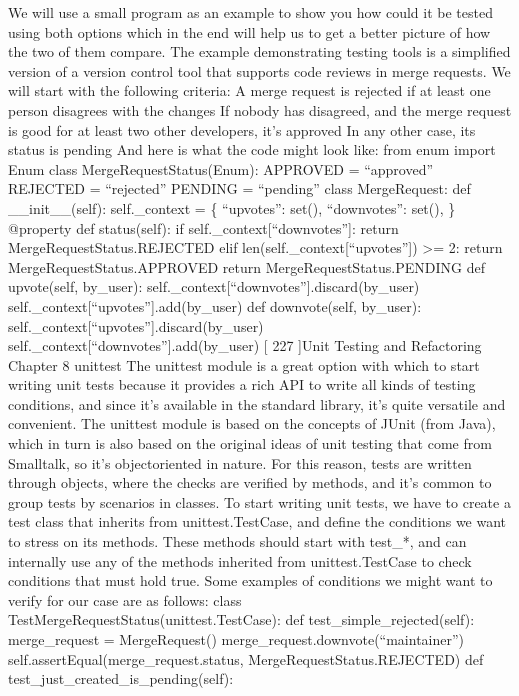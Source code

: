 \documentclass[a4paper,10pt,english]{sphinxmanual}
\begin{document}
We will use a small program as an example to show you how could it be tested using both
options which in the end will help us to get a better picture of how the two of them
compare.
The example demonstrating testing tools is a simplified version of a version control tool
that supports code reviews in merge requests. We will start with the following criteria:
A merge request is rejected if at least one person disagrees with the changes
If nobody has disagreed, and the merge request is good for at least two other
developers, it’s approved
In any other case, its status is pending
And here is what the code might look like:
from enum import Enum
class MergeRequestStatus(Enum):
APPROVED = “approved”
REJECTED = “rejected”
PENDING = “pending”
class MergeRequest:
def \_\_init\_\_(self):
self.\_context = \{
“upvotes”: set(),
“downvotes”: set(),
\}
@property
def status(self):
if self.\_context{[}“downvotes”{]}:
return MergeRequestStatus.REJECTED
elif len(self.\_context{[}“upvotes”{]}) \textgreater{}= 2:
return MergeRequestStatus.APPROVED
return MergeRequestStatus.PENDING
def upvote(self, by\_user):
self.\_context{[}“downvotes”{]}.discard(by\_user)
self.\_context{[}“upvotes”{]}.add(by\_user)
def downvote(self, by\_user):
self.\_context{[}“upvotes”{]}.discard(by\_user)
self.\_context{[}“downvotes”{]}.add(by\_user)
{[} 227 {]}Unit Testing and Refactoring
Chapter 8
unittest
The unittest module is a great option with which to start writing unit tests because it
provides a rich API to write all kinds of testing conditions, and since it’s available in the
standard library, it’s quite versatile and convenient.
The unittest module is based on the concepts of JUnit (from Java), which in turn is also
based on the original ideas of unit testing that come from Smalltalk, so it’s object\sphinxhyphen{}oriented in
nature. For this reason, tests are written through objects, where the checks are verified by
methods, and it’s common to group tests by scenarios in classes.
To start writing unit tests, we have to create a test class that inherits from
unittest.TestCase, and define the conditions we want to stress on its methods. These
methods should start with test\_*, and can internally use any of the methods inherited
from unittest.TestCase to check conditions that must hold true.
Some examples of conditions we might want to verify for our case are as follows:
class TestMergeRequestStatus(unittest.TestCase):
def test\_simple\_rejected(self):
merge\_request = MergeRequest()
merge\_request.downvote(“maintainer”)
self.assertEqual(merge\_request.status, MergeRequestStatus.REJECTED)
def test\_just\_created\_is\_pending(self):
\end{document}
